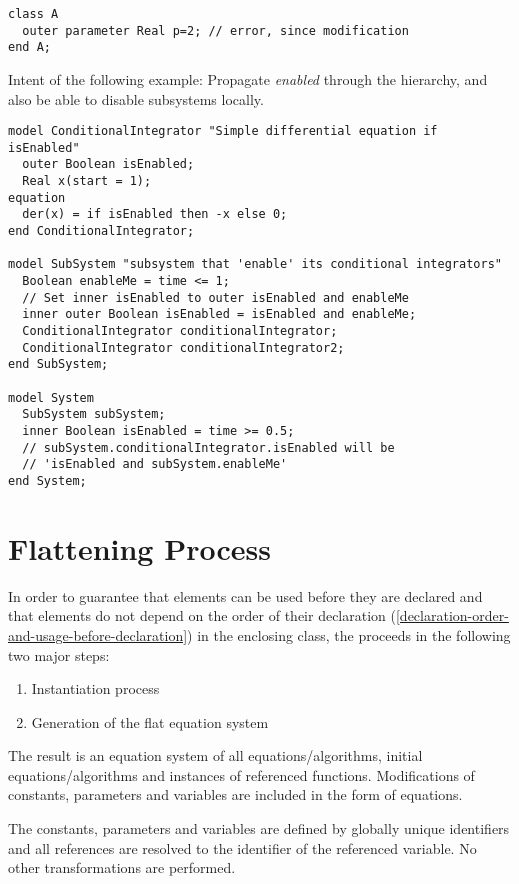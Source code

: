 \begin{example}
\begin{lstlisting}[language=modelica]
class A
  outer parameter Real p=2; // error, since modification
end A;
\end{lstlisting}

Intent of the following example: Propagate \emph{enabled} through the hierarchy, and also be able to disable subsystems locally.
\begin{lstlisting}[language=modelica]
model ConditionalIntegrator "Simple differential equation if isEnabled"
  outer Boolean isEnabled;
  Real x(start = 1);
equation
  der(x) = if isEnabled then -x else 0;
end ConditionalIntegrator;

model SubSystem "subsystem that 'enable' its conditional integrators"
  Boolean enableMe = time <= 1;
  // Set inner isEnabled to outer isEnabled and enableMe
  inner outer Boolean isEnabled = isEnabled and enableMe;
  ConditionalIntegrator conditionalIntegrator;
  ConditionalIntegrator conditionalIntegrator2;
end SubSystem;

model System
  SubSystem subSystem;
  inner Boolean isEnabled = time >= 0.5;
  // subSystem.conditionalIntegrator.isEnabled will be
  // 'isEnabled and subSystem.enableMe'
end System;
\end{lstlisting}
\end{example}


\section{Flattening Process}\label{flattening-process}

In order to guarantee that elements can be used before they are declared and that elements do not depend on the order of their declaration (\cref{declaration-order-and-usage-before-declaration}) in the enclosing class, the  proceeds in the following two major steps:
\begin{enumerate}
\item
  Instantiation process
\item
  Generation of the flat equation system
\end{enumerate}

The result is an equation system of all equations/algorithms, initial equations/algorithms and instances of referenced functions.
Modifications of constants, parameters and variables are included in the form of equations.

The constants, parameters and variables are defined by globally unique identifiers and all references are resolved to the identifier of the referenced variable.
No other transformations are performed.


